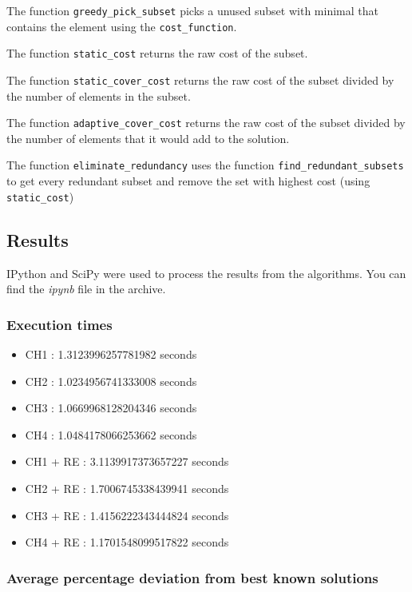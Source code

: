 \documentclass[a4paper,12pt]{article}
\begin{document}
The function \texttt{greedy\_pick\_subset} picks a unused subset with minimal that contains the element using the \texttt{cost\_function}.

The function \texttt{static\_cost} returns the raw cost of the subset.

The function \texttt{static\_cover\_cost} returns the raw cost of the subset divided by the number of elements in the subset.

The function \texttt{adaptive\_cover\_cost} returns the raw cost of the subset divided by the number of elements that it would add to the solution.

The function \texttt{eliminate\_redundancy} uses the function \texttt{find\_redundant\_subsets} to get every redundant subset and remove the set with highest cost (using \texttt{static\_cost})

\subsection{Results}

IPython and SciPy were used to process the results from the algorithms. You can find the \textit{ipynb} file in the archive.

\subsubsection{Execution times}

\begin{itemize}
    \item CH1 : 1.3123996257781982 seconds
    \item CH2 : 1.0234956741333008 seconds
    \item CH3 : 1.0669968128204346 seconds
    \item CH4 : 1.0484178066253662 seconds
    \item CH1 + RE : 3.1139917373657227 seconds
    \item CH2 + RE : 1.7006745338439941 seconds
    \item CH3 + RE : 1.4156222343444824 seconds
    \item CH4 + RE : 1.1701548099517822 seconds
\end{itemize}

\subsubsection{Average percentage deviation from best known solutions}
\end{document}
